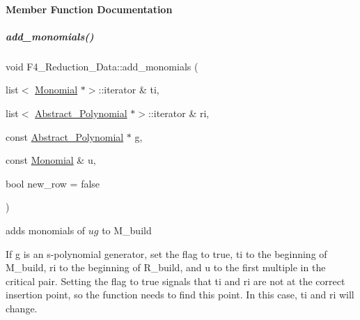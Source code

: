 \paragraph{Member Function Documentation}
\mbox{\label{group___g_b_computation_ad241aa62afb6b6e0b482496c7559f092}} 
\subparagraph{\texorpdfstring{add\+\_\+monomials()}{add\_monomials()}\hspace{0.1cm}{\footnotesize\ttfamily [1/2]}}
{\footnotesize\ttfamily void F4\+\_\+\+Reduction\+\_\+\+Data\+::add\+\_\+monomials (\begin{DoxyParamCaption}\item[{list$<$ \hyperlink{group__polygroup_class_monomial}{Monomial} $\ast$$>$\+::iterator \&}]{ti,  }\item[{list$<$ \hyperlink{group__polygroup_class_abstract___polynomial}{Abstract\+\_\+\+Polynomial} $\ast$$>$\+::iterator \&}]{ri,  }\item[{const \hyperlink{group__polygroup_class_abstract___polynomial}{Abstract\+\_\+\+Polynomial} $\ast$}]{g,  }\item[{const \hyperlink{group__polygroup_class_monomial}{Monomial} \&}]{u,  }\item[{bool}]{new\+\_\+row = {\ttfamily false} }\end{DoxyParamCaption})}



adds monomials of $ ug $ to {\ttfamily M\+\_\+build} 

If {\ttfamily g} is an s-\/polynomial generator, set the flag to {\ttfamily true}, {\ttfamily ti} to the beginning of {\ttfamily M\+\_\+build}, {\ttfamily ri} to the beginning of {\ttfamily R\+\_\+build}, and {\ttfamily u} to the first multiple in the critical pair. Setting the flag to {\ttfamily true} signals that {\ttfamily ti} and {\ttfamily ri} are not at the correct insertion point, so the function needs to find this point. In this case, {\ttfamily ti} and {\ttfamily ri} will change.

